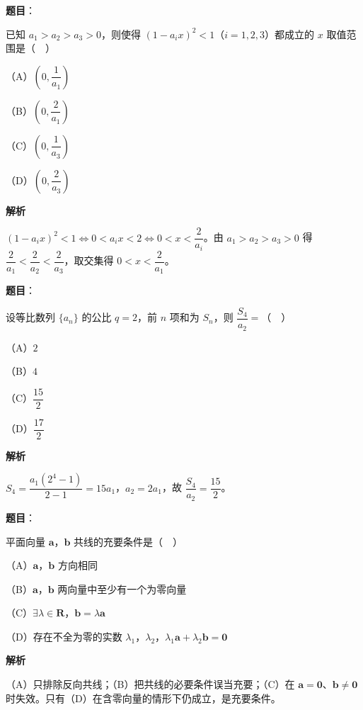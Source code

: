 \begin{answer}

\textbf{题目}：

已知 $a_1>a_2>a_3>0$，则使得 $(1-a_ix)^2<1$（$i=1,2,3$）都成立的 $x$ 取值范围是（　）

（A）$\left(0,\dfrac1{a_1}\right)$

（B）$\left(0,\dfrac2{a_1}\right)$

（C）$\left(0,\dfrac1{a_3}\right)$

（D）$\left(0,\dfrac2{a_3}\right)$

\textbf{解析}

$(1-a_ix)^2<1\iff0<a_ix<2\iff0<x<\dfrac2{a_i}$。由 $a_1>a_2>a_3>0$ 得 $\dfrac2{a_1}<\dfrac2{a_2}<\dfrac2{a_3}$，取交集得 $0<x<\dfrac2{a_1}$。


\end{answer}
\begin{answer}

\textbf{题目}：

设等比数列 $\{a_n\}$ 的公比 $q=2$，前 $n$ 项和为 $S_n$，则 $\dfrac{S_4}{a_2}=$（　）

（A）$2$

（B）$4$

（C）$\dfrac{15}2$

（D）$\dfrac{17}2$

\textbf{解析}

$S_4=\dfrac{a_1(2^4-1)}{2-1}=15a_1$，$a_2=2a_1$，故 $\dfrac{S_4}{a_2}=\dfrac{15}2$。


\end{answer}
\begin{answer}

\textbf{题目}：

平面向量 $\boldsymbol a$，$\boldsymbol b$ 共线的充要条件是（　）

（A）$\boldsymbol a$，$\boldsymbol b$ 方向相同

（B）$\boldsymbol a$，$\boldsymbol b$ 两向量中至少有一个为零向量

（C）$\exists\lambda\in\mathbf R$，$\boldsymbol b=\lambda\boldsymbol a$

（D）存在不全为零的实数 $\lambda_1$，$\lambda_2$，$\lambda_1\boldsymbol a+\lambda_2\boldsymbol b=\boldsymbol 0$

\textbf{解析}

（A）只排除反向共线；（B）把共线的必要条件误当充要；（C）在 $\boldsymbol a=\boldsymbol 0$、$\boldsymbol b\neq\boldsymbol 0$ 时失效。只有（D）在含零向量的情形下仍成立，是充要条件。


\end{answer}
